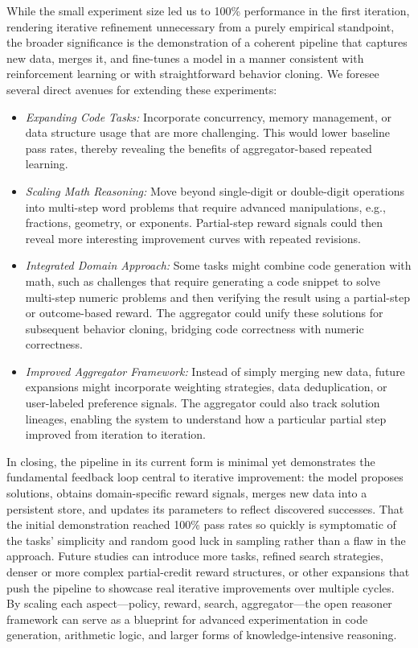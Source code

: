 \documentclass{article}
\begin{document}
While the small experiment size led us to 100\% performance in the first iteration, rendering iterative refinement unnecessary from a purely empirical standpoint, the broader significance is the demonstration of a coherent pipeline that captures new data, merges it, and fine-tunes a model in a manner consistent with reinforcement learning or with straightforward behavior cloning. We foresee several direct avenues for extending these experiments:
\begin{itemize}
\item \textit{Expanding Code Tasks:} Incorporate concurrency, memory management, or data structure usage that are more challenging. This would lower baseline pass rates, thereby revealing the benefits of aggregator-based repeated learning.
\item \textit{Scaling Math Reasoning:} Move beyond single-digit or double-digit operations into multi-step word problems that require advanced manipulations, e.g., fractions, geometry, or exponents. Partial-step reward signals could then reveal more interesting improvement curves with repeated revisions.
\item \textit{Integrated Domain Approach:} Some tasks might combine code generation with math, such as challenges that require generating a code snippet to solve multi-step numeric problems and then verifying the result using a partial-step or outcome-based reward. The aggregator could unify these solutions for subsequent behavior cloning, bridging code correctness with numeric correctness.
\item \textit{Improved Aggregator Framework:} Instead of simply merging new data, future expansions might incorporate weighting strategies, data deduplication, or user-labeled preference signals. The aggregator could also track solution lineages, enabling the system to understand how a particular partial step improved from iteration to iteration.
\end{itemize}

In closing, the pipeline in its current form is minimal yet demonstrates the fundamental feedback loop central to iterative improvement: the model proposes solutions, obtains domain-specific reward signals, merges new data into a persistent store, and updates its parameters to reflect discovered successes. That the initial demonstration reached 100\% pass rates so quickly is symptomatic of the tasks’ simplicity and random good luck in sampling rather than a flaw in the approach. Future studies can introduce more tasks, refined search strategies, denser or more complex partial-credit reward structures, or other expansions that push the pipeline to showcase real iterative improvements over multiple cycles. By scaling each aspect—policy, reward, search, aggregator—the open reasoner framework can serve as a blueprint for advanced experimentation in code generation, arithmetic logic, and larger forms of knowledge-intensive reasoning.
\end{document}
